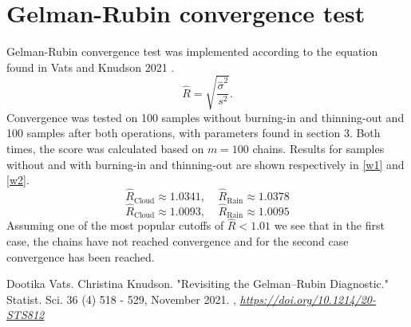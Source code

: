 \documentclass[a4paper,11pt]{article}
\begin{document}
\section{Gelman-Rubin convergence test}
Gelman-Rubin convergence test was implemented according to the equation found in Vats and Knudson 2021  \cite{gr}.
\begin{equation}
    \hat{R} = \sqrt{\frac{\hat{\sigma}^2}{s^2}}.
\end{equation}
Convergence was tested on 100 samples without burning-in and thinning-out and 100 samples after both operations, with parameters found in section 3. Both times, the score was calculated based on $m=100$ chains. Results for samples without and with burning-in and thinning-out are shown respectively in \ref{w1} and \ref{w2}.
\begin{equation}
    \hat{R}_{\text{Cloud}} \approx 1.0341, \; \; \; \; \hat{R}_{\text{Rain}} \approx 1.0378
    \label{w1}
\end{equation}
\begin{equation}
    \hat{R}_{\text{Cloud}} \approx 1.0093, \; \; \; \; \hat{R}_{\text{Rain}} \approx 1.0095
    \label{w2}
\end{equation}
Assuming one of the most popular cutoffs of $\hat{R} < 1.01$ \cite{gr} we see that in the first case, the chains have not reached convergence and for the second case convergence has been reached.


\begin{thebibliography}{9}

    Dootika Vats. Christina Knudson. "Revisiting the Gelman–Rubin Diagnostic." Statist. Sci. 36 (4) 518 - 529, November 2021. ,
    \emph{\href{https://doi.org/10.1214/20-STS812}{https://doi.org/10.1214/20-STS812}}

\end{thebibliography}
\end{document}
